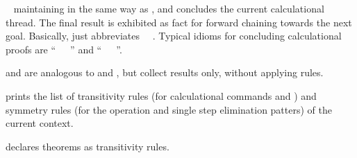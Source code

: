 \begin{isabellebody}
\begin{isamarkuptext}
\begin{description}
  \item \hyperlink{command.finally}{\mbox{}}~ maintaining \hyperlink{fact.calculation}{\mbox{}} in the same way as \hyperlink{command.also}{\mbox{}}, and concludes the
  current calculational thread.  The final result is exhibited as fact
  for forward chaining towards the next goal. Basically, \hyperlink{command.finally}{\mbox{}} just abbreviates \hyperlink{command.also}{\mbox{}}~\hyperlink{command.from}{\mbox{}}~\hyperlink{fact.calculation}{\mbox{}}.  Typical idioms for concluding
  calculational proofs are ``\hyperlink{command.finally}{\mbox{}}~\hyperlink{command.show}{\mbox{}}~~\hyperlink{command.dot}{\mbox{}}'' and ``\hyperlink{command.finally}{\mbox{}}~\hyperlink{command.have}{\mbox{}}~~\hyperlink{command.dot}{\mbox{}}''.

  \item \hyperlink{command.moreover}{\mbox{}} and \hyperlink{command.ultimately}{\mbox{}} are
  analogous to \hyperlink{command.also}{\mbox{}} and \hyperlink{command.finally}{\mbox{}}, but collect
  results only, without applying rules.

  \item \hyperlink{command.print-trans-rules}{\mbox{}} prints the list of transitivity
  rules (for calculational commands \hyperlink{command.also}{\mbox{}} and \hyperlink{command.finally}{\mbox{}}) and symmetry rules (for the \hyperlink{attribute.symmetric}{\mbox{}}
  operation and single step elimination patters) of the current
  context.

  \item \hyperlink{attribute.trans}{\mbox{}} declares theorems as transitivity rules.


\end{description}
\end{isamarkuptext}
\end{isabellebody}
